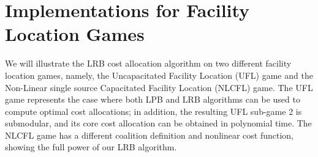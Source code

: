\documentclass[ijoc,nonblindrev]{informs3} %
\begin{document}
\section{Implementations for Facility Location Games}\label{section:implementation}
We will illustrate the LRB cost allocation algorithm on two different facility location games, namely, the Uncapacitated Facility Location (UFL) game and the Non-Linear single source Capacitated Facility Location (NLCFL) game.
The UFL game represents the case where both LPB and LRB algorithms can be used to compute optimal cost allocations; in addition, the resulting UFL sub-game 2 is submodular, and its core cost allocation can be obtained in polynomial time.
The NLCFL game has a different coalition definition and nonlinear cost function, showing the full power of our LRB algorithm.
\end{document}

